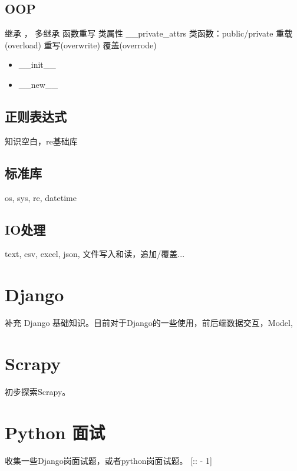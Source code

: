 \documentclass[UTF8]{article}
\begin{document}
\subsection{OOP}

继承 ， 多继承 \newline
函数重写 \newline
类属性  \_\_private\_attrs \newline
类函数：public/private \newline
重载(overload)\newline
重写(overwrite)\newline
覆盖(overrode)\newline

\begin{itemize}
    \item \_\_init\_\_
    \item \_\_new\_\_
\end{itemize}


\subsection{正则表达式}
知识空白，re基础库

\subsection{标准库}
os, sys, re, datetime

\subsection{IO处理}
text, csv, excel, json, 文件写入和读，追加/覆盖...

\section{Django}

补充 Django 基础知识。目前对于Django的一些使用，前后端数据交互，Model,


\section{Scrapy}
初步探索Scrapy。

\section{Python 面试}
收集一些Django岗面试题，或者python岗面试题。
[:: - 1]
\end{document}
